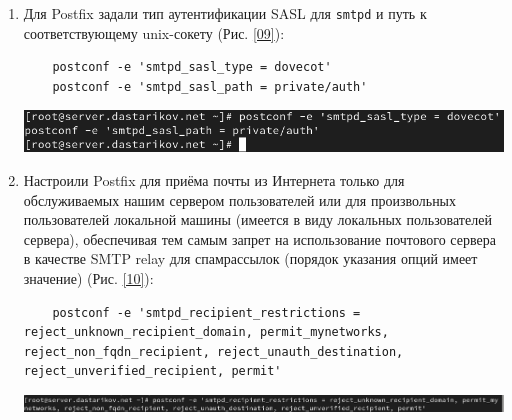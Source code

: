 \begin{enumerate}
\item Для Postfix задали тип аутентификации SASL для \texttt{smtpd} и путь к соответствующему unix-сокету (Рис. \ref{09}):
  \begin{verbatim}
    postconf -e 'smtpd_sasl_type = dovecot'
    postconf -e 'smtpd_sasl_path = private/auth'
  \end{verbatim}
\begin{center}
    \centering
    \includegraphics[width=\textwidth]{../images/image09.png}
    \label{09}
\end{center}
\item Настроили Postfix для приёма почты из Интернета только для обслуживаемых нашим сервером пользователей или для произвольных пользователей локальной машины (имеется в виду локальных пользователей сервера), обеспечивая тем самым запрет на использование почтового сервера в качестве SMTP relay для спамрассылок (порядок указания опций имеет значение) (Рис. \ref{10}):
  \begin{verbatim}
    postconf -e 'smtpd_recipient_restrictions = reject_unknown_recipient_domain, permit_mynetworks, reject_non_fqdn_recipient, reject_unauth_destination, reject_unverified_recipient, permit'
  \end{verbatim}
\begin{center}
    \centering
    \includegraphics[width=\textwidth]{../images/image10.png}
    \label{10}
\end{center}


\end{enumerate}
